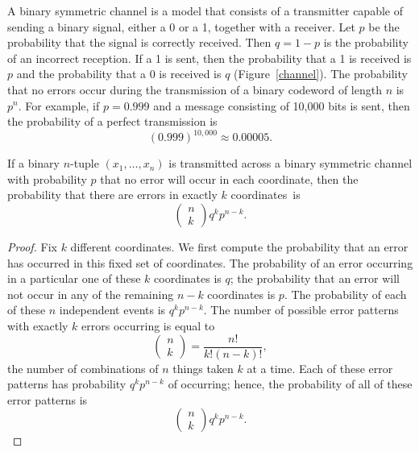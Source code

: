  
 
A {\bfi binary symmetric channel\/}
is a model that consists of a transmitter capable of sending a binary 
signal, either a 0 or a 1, together with a receiver. Let $p$ be the 
probability that the signal is correctly
received. Then $q=1-p$ is the probability of an incorrect reception.
If a 1 is sent, then the probability that a 1 is received is $p$ and
the probability that a 0 is received is $q$ (Figure~\ref{channel}).
The probability that no errors occur during the transmission of a binary
codeword of length $n$ is $p^{n}$. For example, if $p=0.999$ and a
message consisting of 10,000 bits is sent, then the probability of a
perfect transmission is 
\[
(0.999)^{10,000} \approx 0.00005.
\]
 
 
\begin{theorem}
If a binary $n$-tuple $(x_{1}, \ldots, x_{n})$ is transmitted across a
binary symmetric channel with probability $p$ that no error will occur
in each coordinate, then the probability that there are errors in
exactly $k$ coordinates~is
\[
\left(
\begin{array}{c}
n \\ k
\end{array}
\right)
 q^kp^{n-k}.
\]
\end{theorem}
 
 
\begin{proof}
Fix $k$ different coordinates. We first compute the probability that
an error has occurred in this fixed set of coordinates. The
probability of an error occurring in a particular one of these $k$
coordinates is $q$; the probability that an error will not occur
in any of the remaining $n-k$ coordinates is $p$. The
probability of each of these $n$ independent events is
$q^{k}p^{n-k}$. The number of possible error patterns with exactly $k$
errors occurring is equal to 
\[
\left(
\begin{array}{c}
n \\ k
\end{array}
\right)
= \frac{n!}{k!(n-k)!},
\]
the number of combinations of $n$ things taken $k$ at a time. Each of
these error patterns has probability $q^{k}p^{n-k}$ of occurring;
hence, the probability of all of these error patterns is
\[
\left(
\begin{array}{c}
n \\ k
\end{array}
\right)
q^{k}p^{n-k}.
\]
\end{proof}
 
 
\vspace{2ex}
 

